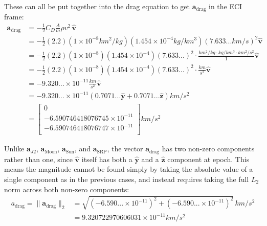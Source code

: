 \documentclass[titlepage]{article}
\begin{document}
These can all be put together into the drag equation to get $\boldsymbol{a}_{\text{drag}}$ in the ECI frame:
\small
\begin{equation}
	\begin{split}
		\boldsymbol{a}_{\text{drag}}&=-\frac{1}{2}C_D\frac{A}{m}\rho v^2\,\hat{\boldsymbol{v}}\\
		&=-\frac{1}{2}(2.2)(1\times10^{-8}km^2/kg)(1.454\times10^{-4}kg/km^3)(7.633...km/s)^2\hat{\boldsymbol{v}}\\
		&=-\frac{1}{2}(2.2)(1\times10^{-8})(1.454\times10^{-4})(7.633...)^2\cdot\frac{km^2/kg\cdot kg/km^3\cdot km^2/s^2}{1}\hat{\boldsymbol{v}}\\
		&=-\frac{1}{2}(2.2)(1\times10^{-8})(1.454\times10^{-4})(7.633...)^2\cdot\frac{km}{s^2}\hat{\boldsymbol{v}}\\
		&=-9.320...\times10^{-11}\frac{km}{s^2}\hat{\boldsymbol{v}}\\
		&=-9.320...\times10^{-11}\left(0.7071...\hat{\boldsymbol{y}}+0.7071...\hat{\boldsymbol{z}}\right)km/s^2\\
		&=\begin{bmatrix}
			0\\
			-6.590746418076745\times10^{-11}\\
			-6.590746418076747\times10^{-11}\\
		\end{bmatrix}km/s^2
	\end{split}
\end{equation}
\normalsize

\begin{mdframed}[linewidth=1pt, innertopmargin=10pt, innerbottommargin=10pt]
	Unlike $\boldsymbol{a}_{J2}$, $\boldsymbol{a}_\text{Moon}$, $\boldsymbol{a}_\text{Sun}$, and $\boldsymbol{a}_\text{SRP}$, the vector $\boldsymbol{a}_\text{drag}$ has two non-zero components rather than one, since $\hat{\boldsymbol{v}}$ itself has both a $\hat{\boldsymbol{y}}$ and a $\hat{\boldsymbol{z}}$ component at epoch. This means the magnitude cannot be found simply by taking the absolute value of a single component as in the previous cases, and instead requires taking the full $L_2$ norm across both non-zero components:
	\small
	\begin{equation}
		\begin{split}
			a_\text{drag} = \|\boldsymbol{a}_\text{drag}\|_2&=\sqrt{\left(-6.590...\times10^{-11}\right)^2+\left(-6.590...\times10^{-11}\right)^2}\,km/s^2\\
			&=9.320722970606031\times10^{-11}km/s^2
		\end{split}
	\end{equation}
	\normalsize
\end{mdframed}
\end{document}
